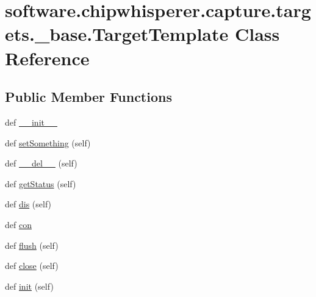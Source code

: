 \hypertarget{classsoftware_1_1chipwhisperer_1_1capture_1_1targets_1_1__base_1_1TargetTemplate}{}\section{software.\+chipwhisperer.\+capture.\+targets.\+\_\+base.\+Target\+Template Class Reference}
\label{classsoftware_1_1chipwhisperer_1_1capture_1_1targets_1_1__base_1_1TargetTemplate}
\subsection*{Public Member Functions}
\begin{DoxyCompactItemize}
\item 
def \hyperlink{classsoftware_1_1chipwhisperer_1_1capture_1_1targets_1_1__base_1_1TargetTemplate_aefdf8f6c430ef7b14e0e3e72aa6cca0b}{\+\_\+\+\_\+init\+\_\+\+\_\+}
\item 
def \hyperlink{classsoftware_1_1chipwhisperer_1_1capture_1_1targets_1_1__base_1_1TargetTemplate_aa7e79302a05dfefe9d4c8541cbedfd95}{set\+Something} (self)
\item 
def \hyperlink{classsoftware_1_1chipwhisperer_1_1capture_1_1targets_1_1__base_1_1TargetTemplate_abd2d8792411a748e1ec9a397d25fb0b2}{\+\_\+\+\_\+del\+\_\+\+\_\+} (self)
\item 
def \hyperlink{classsoftware_1_1chipwhisperer_1_1capture_1_1targets_1_1__base_1_1TargetTemplate_a2d8a641e61fefc6a65e7bef634aea3f0}{get\+Status} (self)
\item 
def \hyperlink{classsoftware_1_1chipwhisperer_1_1capture_1_1targets_1_1__base_1_1TargetTemplate_afd4eee4fa8f12519b58c25e23021a352}{dis} (self)
\item 
def \hyperlink{classsoftware_1_1chipwhisperer_1_1capture_1_1targets_1_1__base_1_1TargetTemplate_a9168b29037eaa6a03c2c3f469b993f26}{con}
\item 
def \hyperlink{classsoftware_1_1chipwhisperer_1_1capture_1_1targets_1_1__base_1_1TargetTemplate_a6ee9b49fedd2112ef4e6ba9afe6c970e}{flush} (self)
\item 
def \hyperlink{classsoftware_1_1chipwhisperer_1_1capture_1_1targets_1_1__base_1_1TargetTemplate_a465fd31720a187751d417ab928d6e0e5}{close} (self)
\item 
def \hyperlink{classsoftware_1_1chipwhisperer_1_1capture_1_1targets_1_1__base_1_1TargetTemplate_adf897f4a76c82e66edc96e1460906791}{init} (self)

\end{DoxyCompactItemize}
